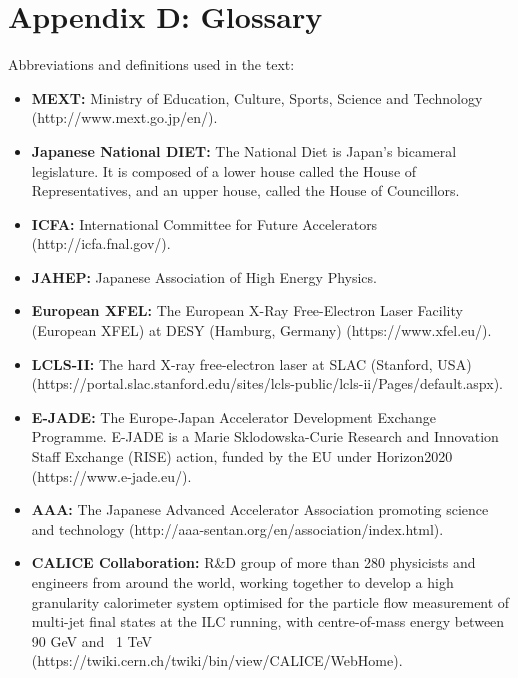 \documentclass[%
 reprint,
 amsmath,amssymb,
 aps,
]{revtex4-1}
\begin{document}
\section*{\label{Appendix4} \Large{Appendix D: Glossary} }
Abbreviations and definitions used in the text:
\begin{itemize}
\item
\textbf{MEXT:} Ministry of Education, Culture, Sports, Science and Technology (http://www.mext.go.jp/en/).
\item
\textbf{Japanese National DIET:} The National Diet is Japan's bicameral legislature. It is composed of a lower house called the House of Representatives, and an upper house, called the House of Councillors.
\item
\textbf{ICFA:} International Committee for Future Accelerators (http://icfa.fnal.gov/).
\item
\textbf{JAHEP:} Japanese Association of High Energy Physics.
\item
\textbf{European XFEL:} The European X-Ray Free-Electron Laser Facility (European XFEL) at DESY (Hamburg, Germany) (https://www.xfel.eu/).
\item
\textbf{LCLS-II:}  The hard X-ray free-electron laser at SLAC (Stanford, USA)(https://portal.slac.stanford.edu/sites/lcls-public/lcls-ii/Pages/default.aspx).
\item
\textbf{E-JADE:} The Europe-Japan Accelerator Development Exchange Programme. E-JADE is a Marie Sklodowska-Curie Research and Innovation Staff Exchange (RISE) action, funded by the EU under Horizon2020 (https://www.e-jade.eu/).
\item
\textbf{AAA:} The Japanese Advanced Accelerator Association promoting science and technology (http://aaa-sentan.org/en/association/index.html).
\item
\textbf{CALICE Collaboration:} R\&D group of more than 280 physicists and engineers from around the world, working together to develop a high granularity calorimeter system optimised for the particle flow measurement of multi-jet final states at the ILC running, with centre-of-mass energy between 90 GeV and ~1 TeV (https://twiki.cern.ch/twiki/bin/view/CALICE/WebHome).

\end{itemize}
\end{document}
